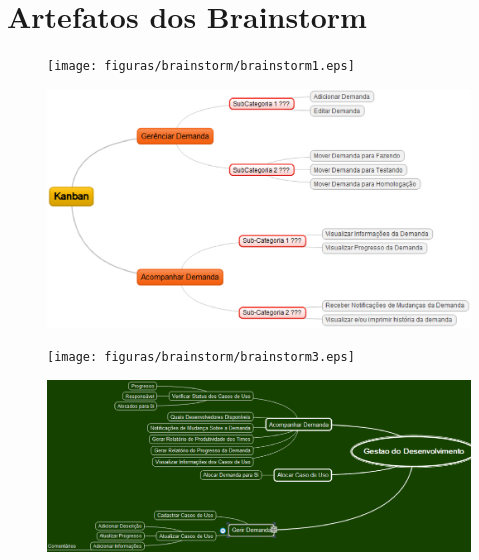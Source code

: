 \chapter[Artefatos dos Brainstorm]{Artefatos dos Brainstorm}

\begin{figure}[H]
	\centering
	\texttt{[image: figuras/brainstorm/brainstorm1.eps]}
	\caption{}
	\label{}
\end{figure}

\begin{figure}[H]
	\centering
	\includegraphics[keepaspectratio=true,scale=0.8]{figuras/brainstorm/brainstorm2.eps}
	\caption{}
	\label{}
\end{figure}

\begin{figure}[H]
	\centering
	\texttt{[image: figuras/brainstorm/brainstorm3.eps]}
	\caption{}
	\label{}
\end{figure}

\begin{figure}[H]
	\centering
	\includegraphics[keepaspectratio=true,scale=0.6]{figuras/brainstorm/brainstorm4.eps}
	\caption{}
	\label{}
\end{figure}